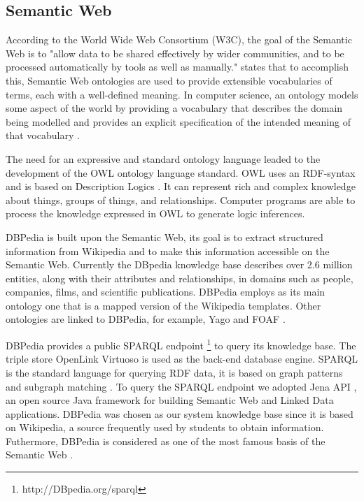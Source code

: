 \documentclass[a4paper,twoside]{article}
\begin{document}
\subsection{Semantic Web}

\noindent According to the World Wide Web Consortium (W3C), the goal of the Semantic Web is to "allow data to be shared effectively by wider communities, and to be processed automatically by tools as well as manually." \cite{ref53} states that to accomplish this, Semantic Web ontologies are used to provide extensible vocabularies of terms, each with a well-defined meaning. In computer science, an ontology models some aspect of the world by providing a vocabulary that describes the domain being modelled and provides an explicit specification of the intended meaning of that vocabulary \cite{ref53}.

The need for an expressive and standard ontology language leaded to the development of the OWL ontology language standard. OWL uses an RDF-syntax and is based on Description Logics \cite{refDL}. It can represent rich and complex knowledge about things, groups of things, and relationships. Computer programs are able to process the knowledge expressed in OWL to generate logic inferences.

DBPedia \cite{refXYZ} is built upon the Semantic Web, its goal is to extract structured information from Wikipedia and to make this information accessible on the Semantic Web. Currently the DBpedia knowledge base describes over 2.6 million entities, along with their attributes and relationships, in domains such as people, companies, films, and scientific publications. DBPedia employs as its main ontology one that is a mapped version of the Wikipedia templates. Other ontologies are linked to DBPedia, for example, Yago \cite{refYAGO} and FOAF \cite{refFOAF}.

DBPedia provides a public SPARQL endpoint \footnote{http://DBpedia.org/sparql} to query its knowledge base. The triple store OpenLink Virtuoso \cite{refVIRT} is used as the back-end database engine. SPARQL is the standard language for querying RDF data, it is based on graph patterns and subgraph matching \cite{refABC,refDEF}. To query the SPARQL endpoint we adopted Jena API \cite{refJENA}, an open source Java framework for building Semantic Web and Linked Data applications. DBPedia was chosen as our system knowledge base since it is based on Wikipedia, a source frequently used by students to obtain information. Futhermore, DBPedia is considered as one of the most famous basis of the Semantic Web \cite{refEntrevista}.
\end{document}
